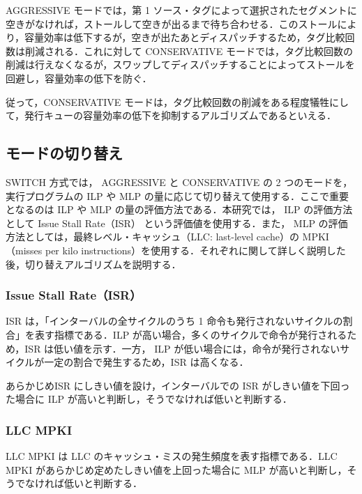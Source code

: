 \documentclass[submit,techrep,noauthor]{ipsj}
\begin{document}
AGGRESSIVE モードでは，第 1 ソース・タグによって選択されたセグメントに空きがなければ，ストールして空きが出るまで待ち合わせる．このストールにより，容量効率は低下するが，空きが出たあとディスパッチするため，タグ比較回数は削減される．これに対して CONSERVATIVE モードでは，タグ比較回数の削減は行えなくなるが，スワップしてディスパッチすることによってストールを回避し，容量効率の低下を防ぐ．

従って，CONSERVATIVE モードは，タグ比較回数の削減をある程度犠牲にして，発行キューの容量効率の低下を抑制するアルゴリズムであるといえる．

\subsection{モードの切り替え}
SWITCH 方式では， AGGRESSIVE と CONSERVATIVE の 2 つのモードを，実行プログラムの ILP や MLP の量に応じて切り替えて使用する．ここで重要となるのは ILP や MLP の量の評価方法である．本研究では， ILP の評価方法として Issue Stall Rate（ISR） という評価値を使用する．また， MLP の評価方法としては，最終レベル・キャッシュ（LLC: last-level cache）の MPKI（misses per kilo instructions）を使用する．それぞれに関して詳しく説明した後，切り替えアルゴリズムを説明する．

\subsubsection{Issue Stall Rate（ISR）}
ISR は，「インターバルの全サイクルのうち 1 命令も発行されないサイクルの割合」を表す指標である．ILP が高い場合，多くのサイクルで命令が発行されるため，ISR は低い値を示す．一方， ILP が低い場合には，命令が発行されないサイクルが一定の割合で発生するため，ISR は高くなる．

あらかじめISR にしきい値を設け，インターバルでの ISR がしきい値を下回った場合に ILP が高いと判断し，そうでなければ低いと判断する．

\subsubsection{LLC MPKI}
LLC MPKI は LLC のキャッシュ・ミスの発生頻度を表す指標である．LLC MPKI があらかじめ定めたしきい値を上回った場合に MLP が高いと判断し，そうでなければ低いと判断する．
\end{document}
